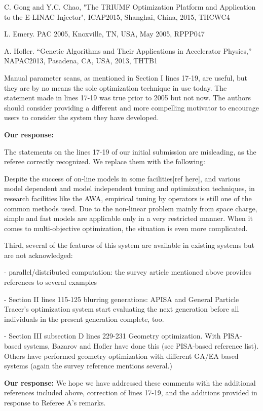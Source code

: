 \documentclass{article}
\begin{document}
C. Gong and Y.C. Chao, "The TRIUMF Optimization Platform and
Application to the E-LINAC Injector", ICAP2015, Shanghai, China, 2015,
THCWC4

L. Emery. PAC 2005, Knoxville, TN, USA, May 2005, RPPP047

A. Hofler. “Genetic Algorithms and Their Applications in
Accelerator Physics,” NAPAC2013, Pasadena, CA, USA, 2013, THTB1

\vspace{5em}



Manual parameter scans, as mentioned in Section I lines 17-19, are
useful, but they are by no means the sole optimization technique in
use today. The statement made in lines 17-19 was true prior to 2005
but not now. The authors should consider providing a different and
more compelling motivator to encourage users to consider the system
they have developed.

{\bf Our response:} {\color{blue} The statements on the lines  17-19 of our initial submission are misleading, as
the referee correctly recognized. We replace them with the following:  

Despite the success of on-line models in some facilities[ref here], and various model dependent and model independent tuning and optimization techniques, in research facilities like the AWA, empirical tuning by operators is still one of the common methods used. Due to the non-linear problem mainly from space charge, simple and fast models are applicable only in a very restricted manner. When it comes to multi-objective optimization, the situation is even more complicated.
}

Third, several of the features of this system are available in
existing systems but are not acknowledged:

- parallel/distributed computation: the survey article mentioned above
provides references to several examples

- Section II lines 115-125 blurring generations: APISA and General
Particle Tracer’s optimization system start evaluating the next
generation before all individuals in the present generation complete,
too.

- Section III subsection D lines 229-231 Geometry optimization. With
PISA-based systems, Bazarov and Hofler have done this (see PISA-based
reference list). Others have performed geometry optimization with
different GA/EA based systems (again the survey reference mentions
several.)

{\bf Our response:} {\color{blue} We hope we have addressed these comments with the additional references included above, correction of lines 17-19, 
	and the additions provided in response to Referee A's remarks.}
\end{document}
